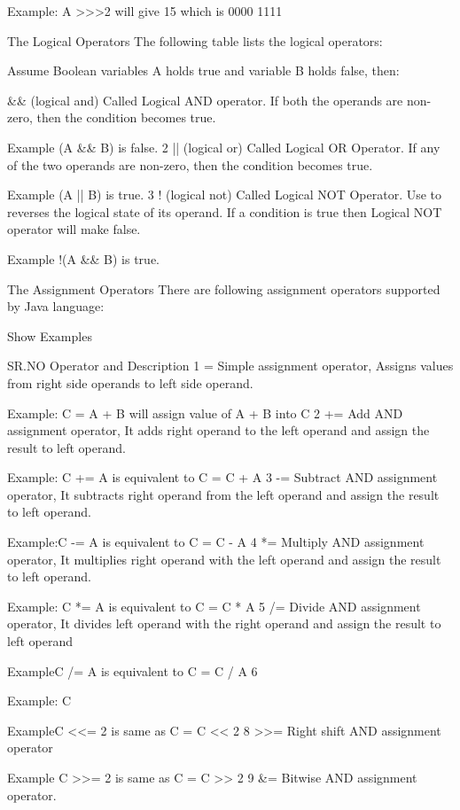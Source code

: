Example: A >>>2 will give 15 which is 0000 1111

The Logical Operators
The following table lists the logical operators:

Assume Boolean variables A holds true and variable B holds false, then:

&& (logical and) Called Logical AND operator. If both the operands are non-zero, then the condition becomes true.

Example (A && B) is false. 2 || (logical or) Called Logical OR Operator. If any of the two operands are non-zero, then the condition becomes true.

Example (A || B) is true. 3 ! (logical not) Called Logical NOT Operator. Use to reverses the logical state of its operand. If a condition is true then Logical NOT operator will make false.

Example !(A && B) is true.

The Assignment Operators
There are following assignment operators supported by Java language:

Show Examples

SR.NO Operator and Description 1 = Simple assignment operator, Assigns values from right side operands to left side operand.

Example: C = A + B will assign value of A + B into C 2 += Add AND assignment operator, It adds right operand to the left operand and assign the result to left operand.

Example: C += A is equivalent to C = C + A 3 -= Subtract AND assignment operator, It subtracts right operand from the left operand and assign the result to left operand.

Example:C -= A is equivalent to C = C - A 4 *= Multiply AND assignment operator, It multiplies right operand with the left operand and assign the result to left operand.

Example: C *= A is equivalent to C = C * A 5 /= Divide AND assignment operator, It divides left operand with the right operand and assign the result to left operand

ExampleC /= A is equivalent to C = C / A 6 %

Example: C %

ExampleC <<= 2 is same as C = C << 2 8 >>= Right shift AND assignment operator

Example C >>= 2 is same as C = C >> 2 9 &= Bitwise AND assignment operator.

